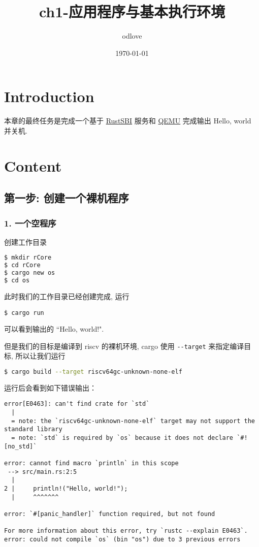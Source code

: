 \documentclass[a4paper]{ctexart}
\begin{document}
\title{ch1-应用程序与基本执行环境}
\author{odlove}
\date{\today}
\maketitle

\section{Introduction}

本章的最终任务是完成一个基于
\href{https://github.com/rustsbi/rustsbi}{RustSBI}
服务和
\href{https://www.qemu.org/}{QEMU}
完成输出 Hello, world 并关机.

\section{Content}

\subsection{第一步: 创建一个裸机程序}

\subsubsection{1. 一个空程序}

创建工作目录
\begin{lstlisting}[language=bash]
$ mkdir rCore
$ cd rCore
$ cargo new os
$ cd os
\end{lstlisting}

此时我们的工作目录已经创建完成,
运行
\begin{lstlisting}
$ cargo run
\end{lstlisting}
可以看到输出的 ``Hello, world!".

但是我们的目标是编译到 riscv 的裸机环境,
cargo 使用 \verb|--target| 来指定编译目标,
所以让我们运行
\begin{lstlisting}[language=bash]
$ cargo build --target riscv64gc-unknown-none-elf
\end{lstlisting}

运行后会看到如下错误输出：
\begin{lstlisting}
error[E0463]: can't find crate for `std`
  |
  = note: the `riscv64gc-unknown-none-elf` target may not support the standard library
  = note: `std` is required by `os` because it does not declare `#![no_std]`

error: cannot find macro `println` in this scope
 --> src/main.rs:2:5
  |
2 |     println!("Hello, world!");
  |     ^^^^^^^

error: `#[panic_handler]` function required, but not found

For more information about this error, try `rustc --explain E0463`.
error: could not compile `os` (bin "os") due to 3 previous errors
\end{lstlisting}
\end{document}
